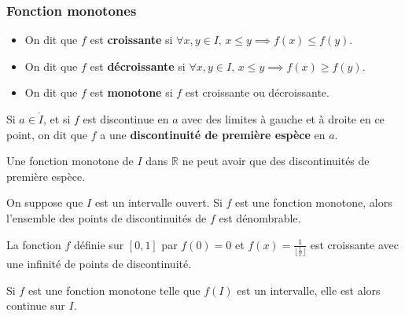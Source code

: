 	\subsubsection{Fonction monotones}


	\begin{definition}
		\begin{itemize}
			\item On dit que $f$ est \textbf{croissante} si $\forall x, y \in I, \, x \leq y \implies f(x) \leq f(y)$.
			\item On dit que $f$ est \textbf{décroissante} si $\forall x, y \in I, \, x \leq y \implies f(x) \geq f(y)$.
			\item On dit que $f$ est \textbf{monotone} si $f$ est croissante ou décroissante.
		\end{itemize}
	\end{definition}


	\begin{definition}
		Si $a \in \mathring{I}$, et si $f$ est discontinue en $a$ avec des limites à gauche et à droite en ce point, on dit que $f$ a une \textbf{discontinuité de première espèce} en $a$.
	\end{definition}

	\begin{proposition}
		Une fonction monotone de $I$ dans $\mathbb{R}$ ne peut avoir que des discontinuités de première espèce.
	\end{proposition}

	\begin{theorem}
		On suppose que $I$ est un intervalle ouvert. Si $f$ est une fonction monotone, alors l'ensemble des points de discontinuités de $f$ est dénombrable.
	\end{theorem}

	\begin{example}
		La fonction $f$ définie sur $[0,1]$ par $f(0) = 0$ et $f(x) = \frac{1}{\lfloor \frac{1}{x} \rfloor}$ est croissante avec une infinité de points de discontinuité.
	\end{example}


	\begin{proposition}
		Si $f$ est une fonction monotone telle que $f(I)$ est un intervalle, elle est alors continue sur $I$.
	\end{proposition}

